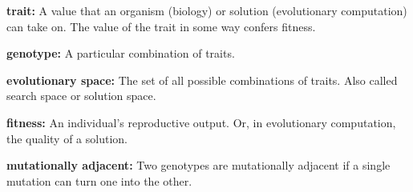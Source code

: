 \begin{tcolorbox}[sharp corners, title=\textbf{Box 1.} Definitions]
 \begin{displayquote}
 \textbf{trait:}  A value that an organism (biology) or solution (evolutionary computation) can take on. The value of the trait in some way confers fitness.
 \end{displayquote}

\begin{displayquote}
\textbf{genotype:}  A particular combination of traits.
\end{displayquote}

\begin{displayquote}

\textbf{evolutionary space:} The set of all possible combinations of traits. Also called search space or solution space.

\end{displayquote}

\begin{displayquote}
\textbf{fitness:} An individual's reproductive output. Or, in evolutionary computation, the quality of a solution.
\end{displayquote}

\begin{displayquote}
\textbf{mutationally adjacent:} Two genotypes are mutationally adjacent if a single mutation can turn one into the other.
\end{displayquote}
 
\end{tcolorbox}